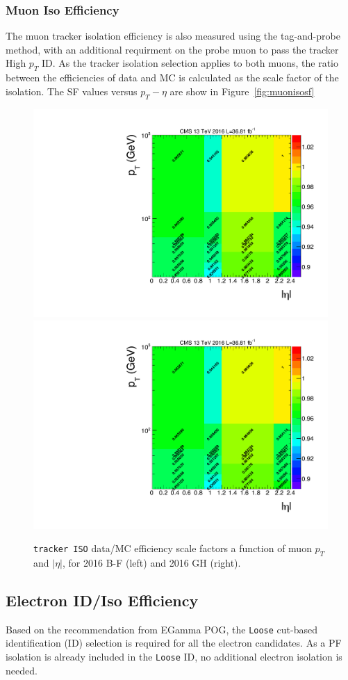 \subsubsection{Muon Iso Efficiency}
The muon tracker isolation efficiency is also measured using the tag-and-probe method, with an additional requirment on the probe muon to pass the tracker High $p_T$ ID. As the tracker isolation selection applies to both muons, the ratio between the efficiencies of data and MC is calculated as the scale factor of the isolation. The SF values versus $p_T - \eta$ are show in Figure~\ref{fig:muonisosf}
\begin{figure}[htbp]
\begin{center}
\includegraphics[width=0.49\linewidth, page=7]{figures/bg_muonidisoeff.pdf}
\includegraphics[width=0.49\linewidth, page=8]{figures/bg_muonidisoeff.pdf}
\caption{\texttt{tracker ISO} data/MC efficiency scale factors a function of muon $p_T$ and $|\eta|$, for 2016 B-F (left) and 2016 GH (right).}
\label{fig:bg_muonisosf}
\end{center}
\end{figure}

\subsection{Electron ID/Iso Efficiency}
Based on the recommendation from EGamma POG, the \texttt{Loose} cut-based identification (ID) selection is required for all the electron candidates. As a PF isolation is already included in the \texttt{Loose} ID, no additional electron isolation is needed.

